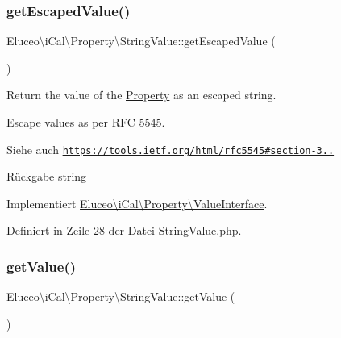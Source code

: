 \subsubsection{\texorpdfstring{get\+Escaped\+Value()}{getEscapedValue()}\hspace{0.1cm}{\footnotesize\ttfamily [3/3]}}
{\footnotesize\ttfamily Eluceo\textbackslash{}i\+Cal\textbackslash{}\+Property\textbackslash{}\+String\+Value\+::get\+Escaped\+Value (\begin{DoxyParamCaption}{ }\end{DoxyParamCaption})}

Return the value of the \mbox{\hyperlink{class_eluceo_1_1i_cal_1_1_property}{Property}} as an escaped string.

Escape values as per R\+FC 5545.

\begin{DoxySeeAlso}{Siehe auch}
\href{https://tools.ietf.org/html/rfc5545#section-3.3.11}{\tt https\+://tools.\+ietf.\+org/html/rfc5545\#section-\/3..}
\end{DoxySeeAlso}
\begin{DoxyReturn}{Rückgabe}
string 
\end{DoxyReturn}


Implementiert \mbox{\hyperlink{interface_eluceo_1_1i_cal_1_1_property_1_1_value_interface_a408412ae5d11fd3f239c7985aede8c32}{Eluceo\textbackslash{}i\+Cal\textbackslash{}\+Property\textbackslash{}\+Value\+Interface}}.



Definiert in Zeile 28 der Datei String\+Value.\+php.

\mbox{\label{class_eluceo_1_1i_cal_1_1_property_1_1_string_value_a0d3ef7c09ebf33769947799a389b5871}} 
\subsubsection{\texorpdfstring{get\+Value()}{getValue()}\hspace{0.1cm}{\footnotesize\ttfamily [1/3]}}
{\footnotesize\ttfamily Eluceo\textbackslash{}i\+Cal\textbackslash{}\+Property\textbackslash{}\+String\+Value\+::get\+Value (\begin{DoxyParamCaption}{ }\end{DoxyParamCaption})}

